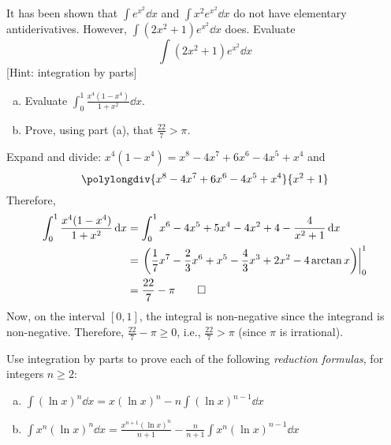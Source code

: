\documentclass{agony}
\begin{document}
\begin{prob}
  It has been shown that $\int e^{x^2} \dd{x}$ and $\int x^2 e^{x^2} \dd{x}$
  do not have elementary antiderivatives.
  However, $\int (2x^2 + 1)e^{x^2} \dd{x}$ does.
  Evaluate \[ \int(2x^2 + 1)e^{x^2} \dd{x} \]
  [Hint: integration by parts]
\end{prob}

\begin{prob}
  \begin{enumerate}[(a)]
    \item Evaluate $\displaystyle\int_0^1 \frac{x^4(1-x^4)}{1+x^2} \dd{x}$.
    \item Prove, using part (a), that $\frac{22}{7} > \pi$.
  \end{enumerate}
\end{prob}
\begin{sol}
  Expand and divide: $x^4(1-x^4) = x^8 - 4x^7 + 6x^6 - 4x^5 + x^4$ and
  \[ \polylongdiv{x^8 - 4x^7 + 6x^6 - 4x^5 + x^4}{x^2 + 1} \]
  Therefore,
  \begin{align*}
    \int_0^1 \frac{x^4(1-x^4)}{1+x^2} \dd{x}
     & = \int_0^1 x^6 - 4x^5 + 5x^4 - 4x^2 + 4 - \frac{4}{x^2 + 1} \dd{x}                  \\
     & = \left.\qty(\frac17 x^7 - \frac23 x^6 + x^5 - \frac43 x^3 + 2x^2 - 4\arctan x)\right|_{0}^1 \\
     & = \frac{22}{7} - \pi \qedhere
  \end{align*}
  Now, on the interval $[0,1]$, the integral is non-negative since the integrand is non-negative.
  Therefore, $\frac{22}{7}-\pi \geq 0$, i.e., $\frac{22}{7} > \pi$
  (since $\pi$ is irrational).
\end{sol}

\begin{prob}
  Use integration by parts to prove each of the following
  \emph{reduction formulas}, for integers $n \geq 2$:
\end{prob}
\begin{enumerate}[(a)]
  \item $\displaystyle\int (\ln x)^n \dd{x}
          = x(\ln x)^n - n\int (\ln x)^{n-1} \dd{x}$
  \item $\displaystyle\int x^n(\ln x)^n \dd{x}
          = \frac{x^{n+1}(\ln x)^n}{n+1}
          - \frac{n}{n+1}\int x^n(\ln x)^{n-1} \dd{x}$
\end{enumerate}
\end{document}
